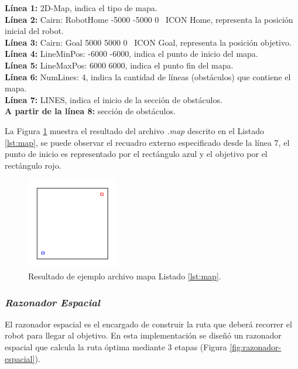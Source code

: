 \documentclass[11pt,twoside,A5]{article}
\newcommand{\reflistings}[1]{Listado \ref{#1}}
\newcommand{\reffigure}[1]{Figura \ref{#1}}
\newcommand{\refpfigure}[1]{(\reffigure{#1})}
\newcommand{\sourcecode}[2][\footnotesize]{{\ttfamily#1#2}}
\begin{document}
\noindent\textbf{Línea 1:} \sourcecode{2D-Map}, indica el tipo de mapa.
\\\textbf{Línea 2:} \sourcecode{Cairn: RobotHome -5000 -5000 0 \textquotedbl\textquotedbl~ICON \textquotedbl Home\textquotedbl}, representa la posición inicial del robot.
\\\textbf{Línea 3:} \sourcecode{Cairn: Goal 5000 5000 0 \textquotedbl\textquotedbl~ICON \textquotedbl Goal\textquotedbl}, representa la posición objetivo.
\\\textbf{Línea 4:} \sourcecode{LineMinPos: -6000 -6000}, indica el punto de inicio del mapa.
\\\textbf{Línea 5:} \sourcecode{LineMaxPos: 6000 6000}, indica el punto fin del mapa.
\\\textbf{Línea 6:} \sourcecode{NumLines: 4}, indica la cantidad de líneas (obstáculos) que contiene el mapa.
\\\textbf{Línea 7:} \sourcecode{LINES}, indica el inicio de la sección de obstáculos.
\\\textbf{A partir de la línea 8:} sección de obstáculos.

La \reffigure{fig:map} muestra el resultado del archivo \textit{.map} descrito en el \reflistings{lst:map}, se puede observar el recuadro
externo especificado desde la línea 7, el punto de inicio es representado por el rectángulo azul y el objetivo por el rectángulo rojo.

\begin{figure}[H]
\begin{center}
\includegraphics[width=4cm]{map.png} 
\caption{Resultado de ejemplo archivo mapa \reflistings{lst:map}.}
\label{fig:map}
\end{center}
\end{figure} 

\subsubsection*{\textit{Razonador Espacial}}

El razonador espacial es el encargado de construir la ruta que deberá recorrer el robot para llegar al objetivo.
En esta implementación se diseñó un razonador espacial que calcula la ruta óptima mediante 3 etapas \refpfigure{fig:razonador-espacial}.
\end{document}
